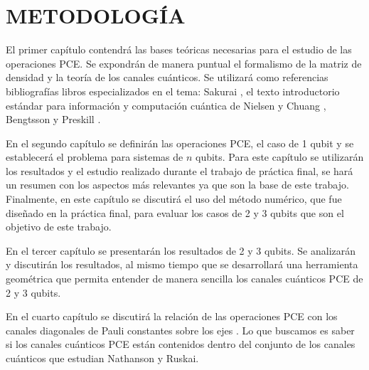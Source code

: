 \chapter{METODOLOGÍA}

El primer capítulo contendrá las bases teóricas necesarias para 
el estudio de las operaciones PCE. Se expondrán de manera puntual el 
formalismo de la matriz de densidad y la teoría de los canales cuánticos.
Se utilizará como referencias bibliografías libros especializados en 
el tema: Sakurai \cite{sakurai_napolitano_2017}, 
el texto introductorio estándar para información y computación cuántica de 
Nielsen y Chuang \cite{nielsen_chuang_2011}, Bengtsson 
\cite{bengtsson_zyczkowski_2017} y Preskill \cite{preskill1998lecture}.

En el segundo capítulo se definirán las operaciones PCE, el caso de 
1 qubit y se establecerá el problema para sistemas de $n$ qubits.
Para este capítulo se utilizarán los resultados y el estudio realizado 
durante el trabajo de práctica final, se hará un resumen con los 
aspectos más relevantes ya que son la base de este trabajo. 
Finalmente, en este capítulo se discutirá el uso del método numérico, 
que fue diseñado en la práctica final, para evaluar los casos de 2 y 3 qubits
que son el objetivo de este trabajo.

En el tercer capítulo se presentarán los resultados de 2 y 3 qubits. Se 
analizarán y discutirán los resultados, al mismo tiempo que se desarrollará 
una herramienta geométrica que permita entender de manera sencilla 
los canales cuánticos PCE de 2 y 3 qubits.

En el cuarto capítulo se discutirá la relación de las operaciones PCE con 
los canales diagonales de Pauli constantes sobre los ejes 
\cite{nathanson2007pauli}. Lo que buscamos es saber si los canales cuánticos
PCE están contenidos dentro del conjunto de los canales cuánticos que
estudian Nathanson y Ruskai. 